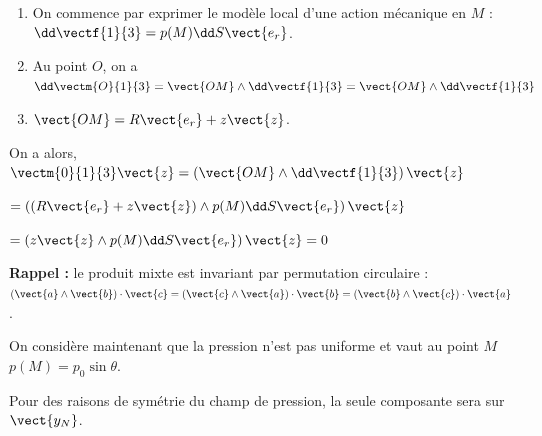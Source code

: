 \ifprof
\begin{corrige}
\begin{enumerate}
\item On commence par exprimer le modèle local d'une action mécanique en $M$ : $\dd \vectf{1}{3} = p(M) \dd S \vect{e_r}$.
\item Au point $O$, on a $\dd \vectm{O}{1}{3}=\vect{OM}\wedge \dd \vectf{1}{3} =\vect{OM}\wedge \dd \vectf{1}{3} $
\item $\vect{OM}=R\vect{e_r}+z\vect{z}$.
\end{enumerate}
On a alors, $ \vectm{0}{1}{3}\vect{z} =\left( \vect{OM}\wedge \dd \vectf{1}{3}\right) \vect{z}$

$ = \left( \left( R\vect{e_r}+z\vect{z} \right) \wedge  p(M) \dd S \vect{e_r}\right) \vect{z}$

$ = \left(z\vect{z} \wedge  p(M) \dd S \vect{e_r}\right) \vect{z} = 0$


\textbf{Rappel :} le produit mixte est invariant par permutation circulaire : $\left( \vect{a}\wedge \vect{b}\right)\cdot \vect{c} = \left( \vect{c}\wedge \vect{a}\right)\cdot \vect{b} = \left( \vect{b}\wedge \vect{c}\right)\cdot \vect{a}$.
\end{corrige}
\else
\fi

\vspace{.5cm}

On considère maintenant que la pression n'est pas uniforme et vaut au point $M$ $p(M)=p_0\sin\theta$.
\ifprof
\begin{corrige}
Pour des raisons de symétrie du champ de pression, la seule composante sera sur $\vect{y_N}$.
\end{corrige}
\else
\fi



